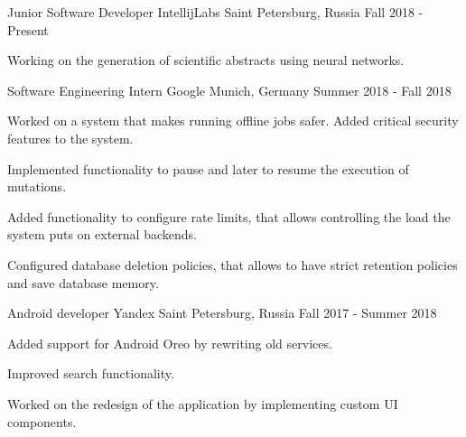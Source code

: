 

\begin{cventries}
    \cventry
    {Junior Software Developer}
    {IntellijLabs}
    {Saint Petersburg, Russia}
    {Fall 2018 - Present}
    {
    \begin{cvitems}
        \item{Working on the generation of scientific abstracts using neural networks.}
    \end{cvitems}
    }
    \cventry
    {Software Engineering Intern} %
    {Google} %
    {Munich, Germany} %
    {Summer 2018 - Fall 2018} %
    {
    \begin{cvitems} %
        \item {Worked on a system that makes running offline jobs safer. Added critical security features to the system.}
        \item {Implemented functionality to pause and later to resume the execution of mutations.}
        \item {Added functionality to configure rate limits, that allows controlling the load the system puts on external backends.}
        \item {Configured database deletion policies, that allows to have strict retention policies and save database memory.}
    \end{cvitems}
    }

    \cventry
    {Android developer} %
    {Yandex} %
    {Saint Petersburg, Russia} %
    {Fall 2017 - Summer 2018} %
    {
    \begin{cvitems} %
        \item {Added support for Android Oreo by rewriting old services.}
        \item {Improved search functionality.}
        \item {Worked on the redesign of the application by implementing custom UI components.}
    \end{cvitems}
    }


\end{cventries}
